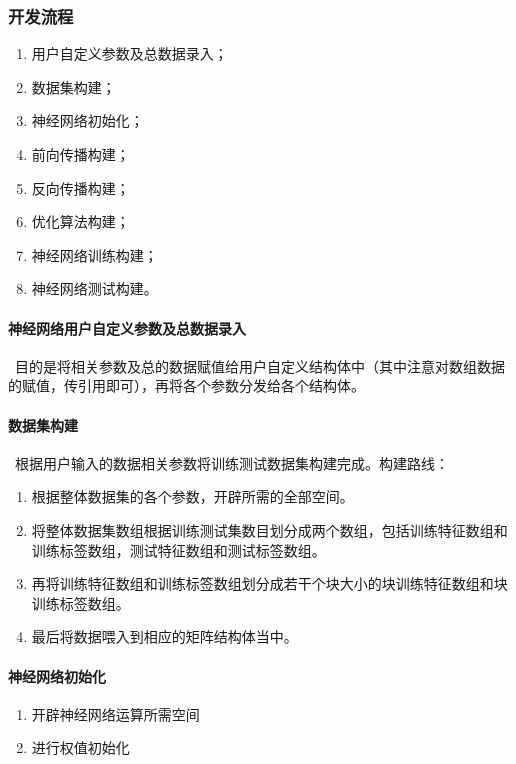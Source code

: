 \newpage
\subsubsection{开发流程}
\begin{enumerate}
  \item 用户自定义参数及总数据录入；
  \item 数据集构建；
  \item 神经网络初始化；
  \item 前向传播构建；
  \item 反向传播构建；
  \item 优化算法构建；
  \item 神经网络训练构建；
  \item 神经网络测试构建。
\end{enumerate}


\paragraph{神经网络用户自定义参数及总数据录入}~目的是将相关参数及总的数据赋值给用户自定义结构体中（其中注意对数组数据的赋值，传引用即可），再将各个参数分发给各个结构体。


\paragraph{数据集构建} ~根据用户输入的数据相关参数将训练测试数据集构建完成。构建路线：
\begin{enumerate}
  \item 根据整体数据集的各个参数，开辟所需的全部空间。
  \item 将整体数据集数组根据训练测试集数目划分成两个数组，包括训练特征数组和训练标签数组，测试特征数组和测试标签数组。
  \item 再将训练特征数组和训练标签数组划分成若干个块大小的块训练特征数组和块训练标签数组。
  \item 最后将数据喂入到相应的矩阵结构体当中。
\end{enumerate}


\paragraph{神经网络初始化}
\begin{enumerate}
  \item 开辟神经网络运算所需空间
  \item 进行权值初始化
\end{enumerate}



